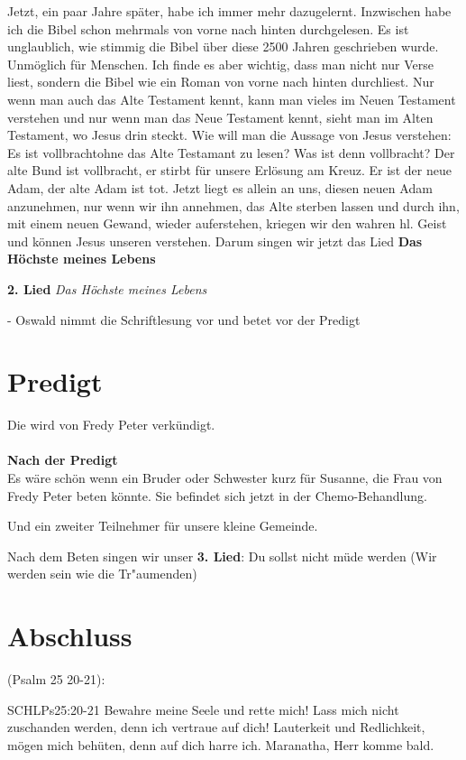 Jetzt, ein paar Jahre später, habe ich immer mehr dazugelernt. Inzwischen habe ich die Bibel schon mehrmals von vorne nach hinten durchgelesen. Es ist unglaublich, wie stimmig die Bibel über diese 2500 Jahren geschrieben wurde. Unmöglich für Menschen. Ich finde es aber wichtig, dass man nicht nur Verse liest, sondern die Bibel wie ein Roman von vorne nach hinten durchliest. Nur wenn man auch das Alte Testament kennt, kann man vieles im Neuen Testament verstehen und nur wenn man das Neue Testament kennt, sieht man im Alten Testament, wo Jesus drin steckt. Wie will man die Aussage von Jesus verstehen: \glqq{}Es ist vollbracht\grqq ohne das Alte Testamant zu lesen? Was ist denn vollbracht? Der alte Bund ist vollbracht, er stirbt für unsere Erlösung am Kreuz. Er ist der neue Adam, der alte Adam ist tot. Jetzt liegt es allein an uns, diesen neuen Adam anzunehmen, nur wenn wir ihn annehmen, das Alte sterben lassen und durch ihn, mit einem neuen Gewand, wieder auferstehen, kriegen wir den wahren hl. Geist und können Jesus unseren \herr{} verstehen.
Darum singen wir jetzt das Lied \textbf{Das Höchste meines Lebens}

\textbf{2. Lied} \textit{Das Höchste meines Lebens}

- Oswald nimmt die Schriftlesung vor und betet vor der Predigt

\section{Predigt}
Die wird von Fredy Peter verkündigt.
\\
\\
\textbf{Nach der Predigt}\\
Es wäre schön wenn ein Bruder oder Schwester kurz für Susanne, die Frau von Fredy Peter beten könnte. 
Sie befindet sich jetzt in der Chemo-Behandlung.

Und ein zweiter Teilnehmer für unsere kleine Gemeinde.

Nach dem Beten singen wir unser \textbf{3. Lied}: Du sollst nicht m\"ude werden (Wir werden sein wie die Tr\̈"aumenden)

\section{Abschluss}
(Psalm 25 20-21):
\begin{bibelbox}{SCHL}{Ps}{25:20-21}
Bewahre meine Seele und rette mich! Lass mich nicht zuschanden werden, denn ich vertraue auf dich! Lauterkeit und Redlichkeit, mögen mich behüten, denn auf dich harre ich.
Maranatha, Herr komme bald.
\end{bibelbox}
